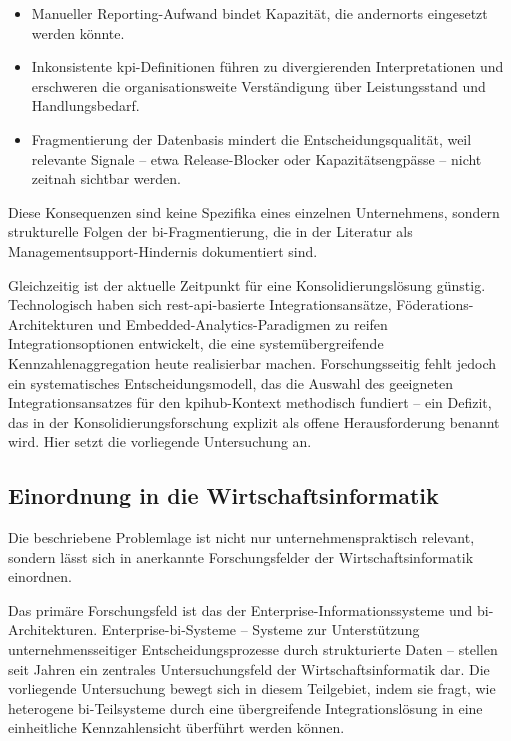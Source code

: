 \begin{itemize}
    \item Manueller Reporting-Aufwand bindet Kapazität, die andernorts eingesetzt werden könnte.
    \item Inkonsistente \gls{kpi}-Definitionen führen zu divergierenden Interpretationen und erschweren die organisationsweite Verständigung über Leistungsstand und Handlungsbedarf.
    \item Fragmentierung der Datenbasis mindert die Entscheidungsqualität, weil relevante Signale -- etwa Release-Blocker oder Kapazitätsengpässe -- nicht zeitnah sichtbar werden.
\end{itemize}
Diese Konsequenzen sind keine Spezifika eines einzelnen Unternehmens, sondern strukturelle Folgen der \gls{bi}-Fragmentierung, die in der Literatur als Managementsupport-Hindernis dokumentiert sind.

Gleichzeitig ist der aktuelle Zeitpunkt für eine Konsolidierungslösung günstig.
Technologisch haben sich \gls{rest}-\gls{api}-basierte Integrationsansätze, Föderations-Architekturen und Embedded-Analytics-Paradigmen zu reifen Integrationsoptionen entwickelt, die eine systemübergreifende Kennzahlenaggregation heute realisierbar machen.
Forschungsseitig fehlt jedoch ein systematisches Entscheidungsmodell, das die Auswahl des geeigneten Integrationsansatzes für den \gls{kpihub}-Kontext methodisch fundiert -- ein Defizit, das in der Konsolidierungsforschung explizit als offene Herausforderung benannt wird.
Hier setzt die vorliegende Untersuchung an.


\subsection{Einordnung in die Wirtschaftsinformatik}
\label{sec:einleitung-wi-einordnung}

Die beschriebene Problemlage ist nicht nur unternehmenspraktisch relevant, sondern lässt sich in anerkannte Forschungsfelder der Wirtschaftsinformatik einordnen.

Das primäre Forschungsfeld ist das der Enterprise-Informationssysteme und \gls{bi}-Architekturen.
Enterprise-\gls{bi}-Systeme -- Systeme zur Unterstützung unternehmensseitiger Entscheidungsprozesse durch strukturierte Daten -- stellen seit Jahren ein zentrales Untersuchungsfeld der Wirtschaftsinformatik dar.
Die vorliegende Untersuchung bewegt sich in diesem Teilgebiet, indem sie fragt, wie heterogene \gls{bi}-Teilsysteme durch eine übergreifende Integrationslösung in eine einheitliche Kennzahlensicht überführt werden können.

